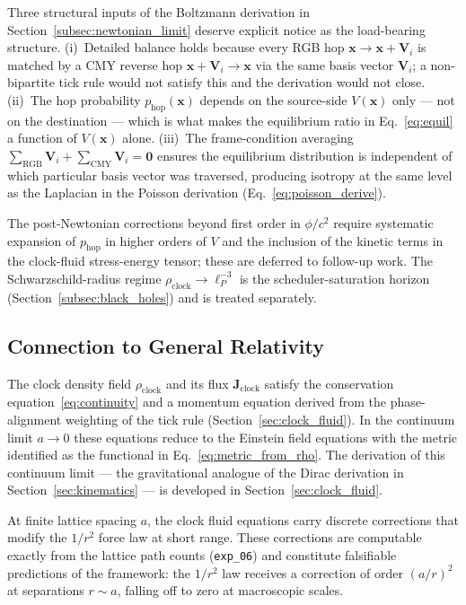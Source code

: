 Three structural inputs of the Boltzmann derivation in
Section~\ref{subsec:newtonian_limit} deserve explicit notice as the
load-bearing structure.  (i)~Detailed balance holds because every RGB
hop $\mathbf{x} \to \mathbf{x} + \mathbf{V}_i$ is matched by a CMY
reverse hop $\mathbf{x} + \mathbf{V}_i \to \mathbf{x}$ via the same
basis vector $\mathbf{V}_i$; a non-bipartite tick rule would not
satisfy this and the derivation would not close.  (ii)~The hop
probability $p_\mathrm{hop}(\mathbf{x})$ depends on the source-side
$V(\mathbf{x})$ only --- not on the destination --- which is what
makes the equilibrium ratio in Eq.~\eqref{eq:equil} a function of
$V(\mathbf{x})$ alone.  (iii)~The frame-condition averaging
$\sum_\text{RGB} \mathbf{V}_i + \sum_\text{CMY} \mathbf{V}_i =
\mathbf{0}$ ensures the equilibrium distribution is independent of
which particular basis vector was traversed, producing isotropy at
the same level as the Laplacian in the Poisson derivation
(Eq.~\eqref{eq:poisson_derive}).

The post-Newtonian corrections beyond first order in $\phi/c^2$
require systematic expansion of $p_\mathrm{hop}$ in higher orders of
$V$ and the inclusion of the kinetic terms in the clock-fluid
stress-energy tensor; these are deferred to follow-up work.  The
Schwarzschild-radius regime $\rho_\text{clock} \to \ell_P^{-3}$ is
the scheduler-saturation horizon (Section~\ref{subsec:black_holes})
and is treated separately.

\subsection{Connection to General Relativity}
\label{subsec:gr_connection}

The clock density field $\rho_\text{clock}$ and its flux $\mathbf{J}_\text{clock}$
satisfy the conservation equation~\eqref{eq:continuity} and a momentum
equation derived from the phase-alignment weighting of the tick rule
(Section~\ref{sec:clock_fluid}).
In the continuum limit $a \to 0$ these equations reduce to the Einstein
field equations with the metric identified as the functional in
Eq.~\eqref{eq:metric_from_rho}.
The derivation of this continuum limit --- the gravitational analogue of
the Dirac derivation in Section~\ref{sec:kinematics} --- is developed in
Section~\ref{sec:clock_fluid}.

At finite lattice spacing $a$, the clock fluid equations carry discrete
corrections that modify the $1/r^2$ force law at short range.
These corrections are computable exactly from the lattice path counts
(\texttt{exp\_06}) and constitute falsifiable predictions of the framework:
the $1/r^2$ law receives a correction of order $(a/r)^2$ at separations
$r \sim a$, falling off to zero at macroscopic scales.

